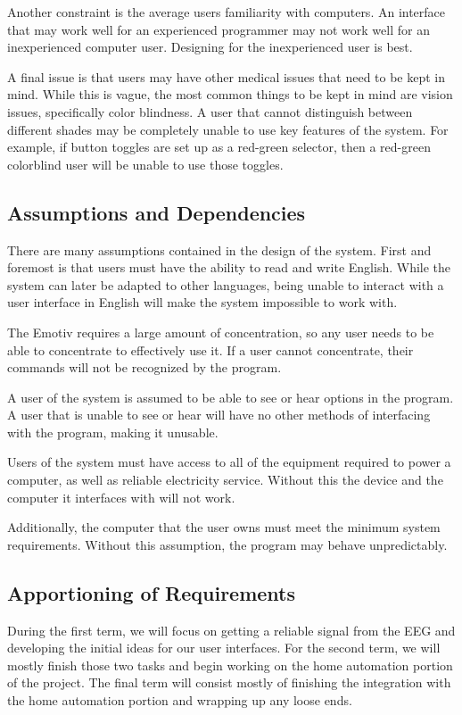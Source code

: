 \documentclass{article}
\begin{document}
Another constraint is the average users familiarity with computers. An
interface that may work well for an experienced programmer may not work well
for an inexperienced computer user. Designing for the inexperienced user is
best.

A final issue is that users may have other medical issues that need to be
kept in mind. While this is vague, the most common things to be kept in mind
are vision issues, specifically color blindness. A user that cannot
distinguish between different shades may be completely unable to use key
features of the system. For example, if button toggles are set up as a
red-green selector, then a red-green colorblind user will be unable to use
those toggles.

\subsection{Assumptions and Dependencies}
There are many assumptions contained in the design of the system. First and
foremost is that users must have the ability to read and write English.
While the system can later be adapted to other languages, being unable to
interact with a user interface in English will make the system impossible to
work with.

The Emotiv requires a large amount of concentration, so any user needs to be
able to concentrate to effectively use it. If a user cannot concentrate,
their commands will not be recognized by the program.

A user of the system is assumed to be able to see or hear options in the
program. A user that is unable to see or hear will have no other methods of
interfacing with the program, making it unusable.

Users of the system must have access to all of the equipment required to
power a computer, as well as reliable electricity service. Without this the
device and the computer it interfaces with will not work.

Additionally, the computer that the user owns must meet the minimum system
requirements. Without this assumption, the program may behave unpredictably.

\subsection{Apportioning of Requirements}
During the first term, we will focus on getting a reliable signal from the EEG and developing the initial ideas for our user interfaces. For the second term, we will mostly finish those two tasks and begin working on the home automation portion of the project. The final term will consist mostly of finishing the integration with the home automation portion and wrapping up any loose ends.
\newpage
\end{document}

